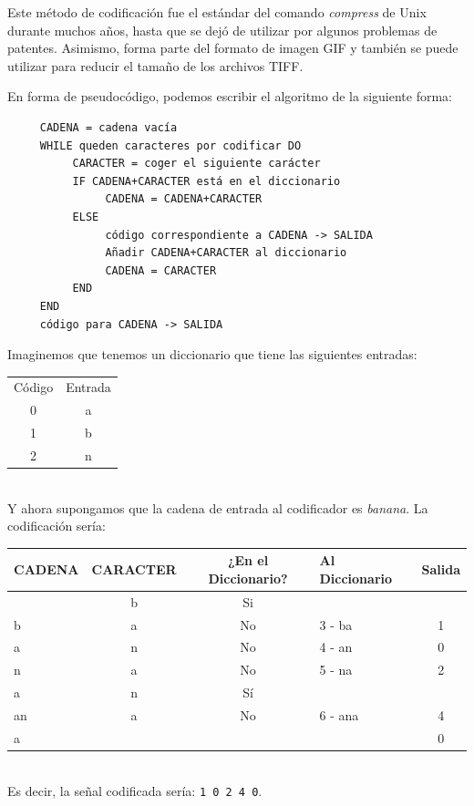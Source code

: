 \documentclass[es,apuntes]{uah}
\begin{document}
Este método de codificación fue el estándar del comando \emph{compress} de Unix durante muchos años, hasta que se dejó de utilizar por algunos problemas de patentes. Asimismo, forma parte del formato de imagen GIF y también se puede utilizar para reducir el tamaño de los archivos TIFF.

En forma de pseudocódigo, podemos escribir el algoritmo de la siguiente forma:

\begin{verbatim}
     CADENA = cadena vacía
     WHILE queden caracteres por codificar DO
          CARACTER = coger el siguiente carácter
          IF CADENA+CARACTER está en el diccionario
               CADENA = CADENA+CARACTER
          ELSE
               código correspondiente a CADENA -> SALIDA
               Añadir CADENA+CARACTER al diccionario
               CADENA = CARACTER
          END
     END
   	 código para CADENA -> SALIDA
\end{verbatim}

Imaginemos que tenemos un diccionario que tiene las siguientes entradas: \\

\begin{tabular}{cc}
Código & Entrada \\
0 & a \\
1 & b \\	
2 & n \\
\end{tabular}
\ \\

Y ahora supongamos que la cadena de entrada al codificador es \emph{banana}. La codificación sería:\\


\begin{tabular}{lcclc}
CADENA & CARACTER  & ¿En el Diccionario? & Al Diccionario & Salida \\
\hline
 	& b & Si &  &  \\
 b & a & No & 3 - ba & 1 \\
 a & n & No & 4 - an & 0 \\
 n & a & No & 5 - na & 2 \\
 a & n & Sí & 		&  \\
 an & a & No & 6 - ana & 4 \\
 a & & & & 0 \\ 	
\end{tabular}

\ \\
Es decir, la señal codificada sería: \texttt{1 0 2 4 0}. \\
\end{document}
